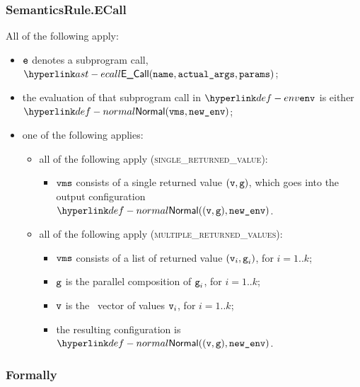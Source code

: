 \subsubsection{SemanticsRule.ECall \label{sec:SemanticsRule.ECall}}
All of the following apply:
\begin{itemize}
  \item $\ve$ denotes a subprogram call, $\ECall(\name, \actualargs, \params)$;
  \item the evaluation of that subprogram call in $\env$ is either
  $\Normal(\vms, \newenv)$\ProseOrAbnormal;
  \item one of the following applies:
  \begin{itemize}
    \item all of the following apply (\textsc{single\_returned\_value}):
    \begin{itemize}
      \item $\vms$ consists of a single returned value $(\vv,\vg)$,
      which goes into the output configuration $\Normal((\vv, \vg), \newenv)$.
    \end{itemize}

    \item all of the following apply (\textsc{multiple\_returned\_values}):
    \begin{itemize}
      \item $\vms$ consists of a list of returned value $(\vv_i,\vg_i)$, for $i=1..k$;
      \item $\vg$ is the parallel composition of $\vg_i$, for $i=1..k$;
      \item $\vv$ is the \nativevalue\  vector of values $\vv_i$, for $i=1..k$;
      \item the resulting configuration is $\Normal((\vv, \vg), \newenv)$.
    \end{itemize}
  \end{itemize}
\end{itemize}

\subsubsection{Formally}
\begin{mathpar}
\end{mathpar}

